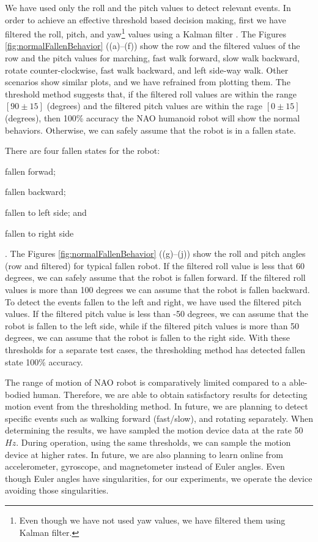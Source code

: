 \documentclass[letterpaper]{article}
\begin{document}
We have used only the roll and the pitch values  to detect relevant events. In order to achieve an
effective threshold based decision making, first we have filtered the roll, pitch, and
yaw\footnote{Even though we have not used yaw values, we have filtered them using Kalman filter.}
values using a Kalman filter \cite{Welch:1995:IKF:897831}. The Figures 
\ref{fig:normalFallenBehavior} ((a)--(f)) show
the row and the filtered values of the row and the pitch values for marching, fast walk forward,
slow walk backward, rotate counter-clockwise, fast walk backward, and left side-way walk. Other
scenarios show similar plots, and we have refrained from plotting them. The threshold method
suggests that, if the filtered roll values are within the range $[90\pm15]$ (degrees) and the
filtered pitch values are within the rage $[0\pm15]$ (degrees), then 100\% accuracy the NAO humanoid
robot will show the normal behaviors. Otherwise, we can safely assume that the robot is in a fallen
state.   

There are four fallen states for the robot: \begin{inparaenum}[(1)] \item fallen
forwad; \item fallen backward; \item fallen to left side; and \item fallen to right
side\end{inparaenum}. The Figures \ref{fig:normalFallenBehavior} ((g)--(j)) show the roll and pitch 
angles (row and
filtered) for typical fallen robot. If the filtered roll value is less that 60 degrees, we can
safely assume that the robot is fallen forward. If the filtered roll values is more than 100
degrees we can assume that the robot is fallen backward. To detect the events fallen to the left
and right, we have used the filtered pitch values. If the filtered pitch value is less than -50
degrees, we can assume that the robot is fallen to the left side, while if the filtered pitch
values is more than 50 degrees, we can assume that the robot is fallen to the right side. With
these thresholds for a separate test cases, the thresholding method has detected fallen state 100\%
accuracy. 



The range of motion of NAO robot is comparatively limited compared to a able-bodied human.
Therefore, we are able to obtain satisfactory results for detecting motion event from the
thresholding method. In future, we are planning to detect specific events such as walking forward
(fast/slow), and rotating separately. When determining the results, we have sampled the motion
device data at the rate 50$Hz$. During operation, using the same thresholds, we can sample the
motion device at higher rates. In future, we are also planning to learn online from accelerometer,
gyroscope, and magnetometer instead of Euler angles. Even though Euler angles have singularities,
for our experiments, we operate the device avoiding those singularities.  
\end{document}
